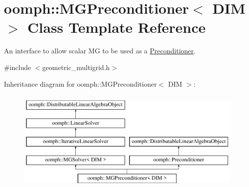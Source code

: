 \hypertarget{classoomph_1_1MGPreconditioner}{}\section{oomph\+:\+:M\+G\+Preconditioner$<$ D\+IM $>$ Class Template Reference}
\label{classoomph_1_1MGPreconditioner}


An interface to allow scalar MG to be used as a \hyperlink{classoomph_1_1Preconditioner}{Preconditioner}.  




{\ttfamily \#include $<$geometric\+\_\+multigrid.\+h$>$}

Inheritance diagram for oomph\+:\+:M\+G\+Preconditioner$<$ D\+IM $>$\+:\begin{figure}[H]
\begin{center}
\leavevmode
\includegraphics[height=5.000000cm]{classoomph_1_1MGPreconditioner}
\end{center}
\end{figure}
